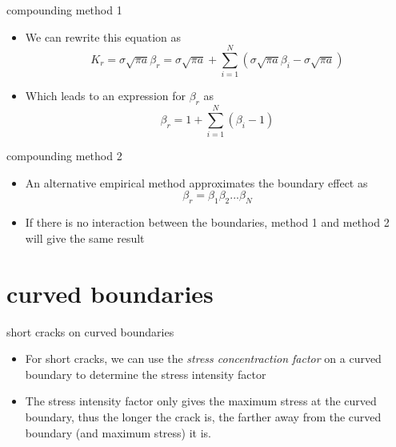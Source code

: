 \documentclass[10pt,handout]{beamer}
\begin{document}
\begin{frame}{compounding method 1}
	\begin{itemize}
		\item We can rewrite this equation as
		\begin{equation}
		K_r = \sigma \sqrt{\pi a} \beta_r = \sigma \sqrt{\pi a} + \sum_{i=1}^{N}(\sigma \sqrt{\pi a}\beta_i - \sigma \sqrt{\pi a})
		\end{equation}
		\item Which leads to an expression for $\beta_r$ as
		\begin{equation}
		\beta_r = 1+\sum_{i=1}^{N} (\beta_i - 1)
		\end{equation}
	\end{itemize}
\end{frame}

\begin{frame}{compounding method 2}
	\begin{itemize}
		\item An alternative empirical method approximates the boundary effect as
		\begin{equation}
		\beta_r = \beta_1 \beta_2 ... \beta_N
		\end{equation}
		\item If there is no interaction between the boundaries, method 1 and method 2 will give the same result
	\end{itemize}
\end{frame}

\section{curved boundaries}

\begin{frame}{short cracks on curved boundaries}
	\begin{itemize}
		\item For short cracks, we can use the \emph{stress concentraction factor} on a curved boundary to determine the stress intensity factor
		\item The stress intensity factor only gives the maximum stress at the curved boundary, thus the longer the crack is, the farther away from the curved boundary (and maximum stress) it is.
	\end{itemize}
\end{frame}
\end{document}
